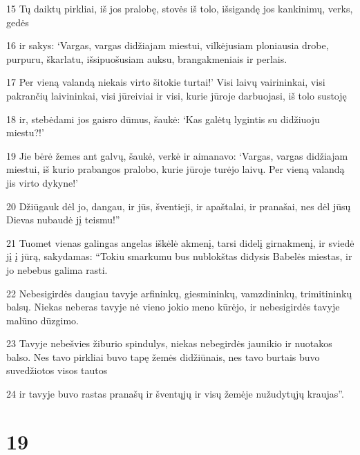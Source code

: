 \par 15 Tų daiktų pirkliai, iš jos pralobę, stovės iš tolo, išsigandę jos kankinimų, verks, gedės 
\par 16 ir sakys: ‘Vargas, vargas didžiajam miestui, vilkėjusiam ploniausia drobe, purpuru, škarlatu, išsipuošusiam auksu, brangakmeniais ir perlais. 
\par 17 Per vieną valandą niekais virto šitokie turtai!’ Visi laivų vairininkai, visi pakrančių laivininkai, visi jūreiviai ir visi, kurie jūroje darbuojasi, iš tolo sustoję 
\par 18 ir, stebėdami jos gaisro dūmus, šaukė: ‘Kas galėtų lygintis su didžiuoju miestu?!’ 
\par 19 Jie bėrė žemes ant galvų, šaukė, verkė ir aimanavo: ‘Vargas, vargas didžiajam miestui, iš kurio prabangos pralobo, kurie jūroje turėjo laivų. Per vieną valandą jis virto dykyne!’ 
\par 20 Džiūgauk dėl jo, dangau, ir jūs, šventieji, ir apaštalai, ir pranašai, nes dėl jūsų Dievas nubaudė jį teismu!” 
\par 21 Tuomet vienas galingas angelas iškėlė akmenį, tarsi didelį girnakmenį, ir sviedė jį į jūrą, sakydamas: “Tokiu smarkumu bus nublokštas didysis Babelės miestas, ir jo nebebus galima rasti. 
\par 22 Nebesigirdės daugiau tavyje arfininkų, giesmininkų, vamzdininkų, trimitininkų balsų. Niekas neberas tavyje nė vieno jokio meno kūrėjo, ir nebesigirdės tavyje malūno dūzgimo. 
\par 23 Tavyje nebešvies žiburio spindulys, niekas nebegirdės jaunikio ir nuotakos balso. Nes tavo pirkliai buvo tapę žemės didžiūnais, nes tavo burtais buvo suvedžiotos visos tautos 
\par 24 ir tavyje buvo rastas pranašų ir šventųjų ir visų žemėje nužudytųjų kraujas”.


\chapter{19}


